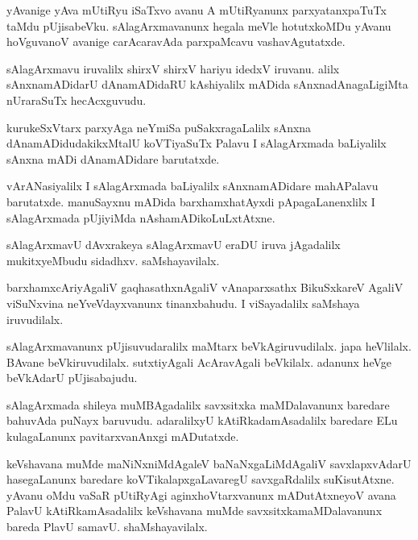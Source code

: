 \documentclass{article}
\begin{document}
\begin{mn}%
yAvanige yAva mUtiRyu iSaTxvo avanu A mUtiRyanunx parxyatanxpaTuTx taMdu pUjisabeVku. 
sAlagArxmavanunx hegala meVle hotutxkoMDu yAvanu hoVguvanoV avanige carAcaravAda parxpaMcavu 
vashavAgutatxde.
\end{mn}

\begin{mn}%
sAlagArxmavu iruvalilx shirxV shirxV hariyu idedxV iruvanu. alilx sAnxnamADidarU dAnamADidaRU 
kAshiyalilx mADida sAnxnadAnagaLigiMta nUraraSuTx hecAcxguvudu.
\end{mn}

\begin{mn}%
kurukeSxVtarx parxyAga neYmiSa puSakxragaLalilx sAnxna dAnamADidudakikxMtalU koVTiyaSuTx Palavu I 
sAlagArxmada baLiyalilx sAnxna mADi dAnamADidare barutatxde.
\end{mn}

\begin{mn}%
vArANasiyalilx I sAlagArxmada baLiyalilx sAnxnamADidare mahAPalavu barutatxde. manuSayxnu mADida 
barxhamxhatAyxdi pApagaLanenxlilx I sAlagArxmada pUjiyiMda nAshamADikoLuLxtAtxne.
\end{mn}

\begin{mn}%
sAlagArxmavU dAvxrakeya sAlagArxmavU eraDU iruva jAgadalilx mukitxyeMbudu sidadhxv. saMshayavilalx.
\end{mn}

\begin{mn}%
barxhamxcAriyAgaliV gaqhasathxnAgaliV vAnaparxsathx BikuSxkareV AgaliV viSuNxvina neYveVdayxvanunx 
tinanxbahudu. I viSayadalilx saMshaya iruvudilalx.
\end{mn}

\begin{mn}%
sAlagArxmavanunx pUjisuvudaralilx maMtarx beVkAgiruvudilalx. japa heVlilalx. BAvane 
beVkiruvudilalx. sutxtiyAgali AcAravAgali beVkilalx. adanunx heVge beVkAdarU pUjisabajudu.
\end{mn}

\begin{mn}%
sAlagArxmada shileya muMBAgadalilx savxsitxka maMDalavanunx baredare bahuvAda puNayx baruvudu. 
adaralilxyU kAtiRkadamAsadalilx baredare ELu kulagaLanunx pavitarxvanAnxgi mADutatxde.
\end{mn}

\begin{mn}%
keVshavana muMde maNiNxniMdAgaleV baNaNxgaLiMdAgaliV savxlapxvAdarU hasegaLanunx baredare 
koVTikalapxgaLavaregU savxgaRdalilx suKisutAtxne. yAvanu oMdu vaSaR pUtiRyAgi aginxhoVtarxvanunx 
mADutAtxneyoV avana PalavU kAtiRkamAsadalilx keVshavana muMde savxsitxkamaMDalavanunx bareda 
PlavU samavU. shaMshayavilalx.
\end{mn}
\end{document}
